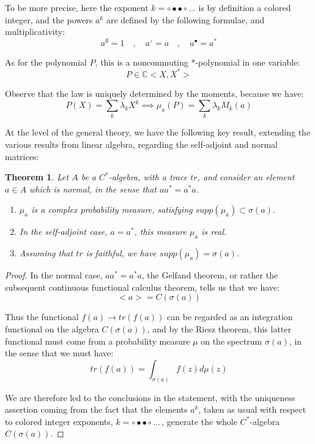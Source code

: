 \documentclass[12pt]{amsbook}
\newtheorem{theorem}{Theorem}[chapter]
\begin{document}
To be more precise, here the exponent $k=\circ\bullet\bullet\circ\ldots$ is by definition a colored integer, and the powers $a^k$ are defined by the following formulae, and multiplicativity: 
$$a^\emptyset=1\quad,\quad
a^\circ=a\quad,\quad
a^\bullet=a^*$$ 

As for the polynomial $P$, this is a noncommuting $*$-polynomial in one variable: 
$$P\in\mathbb C<X,X^*>$$

Observe that the law is uniquely determined by the moments, because we have:
$$P(X)=\sum_k\lambda_kX^k
\implies\mu_a(P)=\sum_k\lambda_kM_k(a)$$

At the level of the general theory, we have the following key result, extending the various results from linear algebra, regarding the self-adjoint and normal matrices:


\begin{theorem}
Let $A$ be a $C^*$-algebra, with a trace $tr$, and consider an element $a\in A$ which is normal, in the sense that $aa^*=a^*a$.
\begin{enumerate}
\item $\mu_a$ is a complex probability measure, satisfying $supp(\mu_a)\subset\sigma(a)$.

\item In the self-adjoint case, $a=a^*$, this measure $\mu_a$ is real.

\item Assuming that $tr$ is faithful, we have $supp(\mu_a)=\sigma(a)$.
\end{enumerate}
\end{theorem}

\begin{proof}
In the normal case, $aa^*=a^*a$, the Gelfand theorem, or rather the subsequent continuous functional calculus theorem, tells us that we have: 
$$<a>=C(\sigma(a))$$

Thus the functional $f(a)\to tr(f(a))$ can be regarded as an integration functional on the algebra $C(\sigma(a))$, and by the Riesz theorem, this latter functional must come from a probability measure $\mu$ on the spectrum $\sigma(a)$, in the sense that we must have:
$$tr(f(a))=\int_{\sigma(a)}f(z)d\mu(z)$$

We are therefore led to the conclusions in the statement, with the uniqueness assertion coming from the fact that the elements $a^k$, taken as usual with respect to colored integer exponents, $k=\circ\bullet\bullet\circ\ldots$\,, generate the whole $C^*$-algebra $C(\sigma(a))$.
\end{proof}
\end{document}
